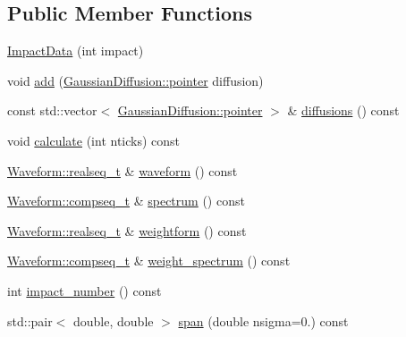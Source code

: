 \subsection*{Public Member Functions}
\begin{DoxyCompactItemize}
\item 
\hyperlink{class_wire_cell_1_1_gen_1_1_impact_data_a7e5a8376b65210d695b42d0cd587372f}{Impact\+Data} (int impact)
\item 
void \hyperlink{class_wire_cell_1_1_gen_1_1_impact_data_ac43cc32d2ea372cfc6807a72774493ec}{add} (\hyperlink{class_wire_cell_1_1_gen_1_1_gaussian_diffusion_ac7fce7070c18877fa61abc26ad410ce9}{Gaussian\+Diffusion\+::pointer} diffusion)
\item 
const std\+::vector$<$ \hyperlink{class_wire_cell_1_1_gen_1_1_gaussian_diffusion_ac7fce7070c18877fa61abc26ad410ce9}{Gaussian\+Diffusion\+::pointer} $>$ \& \hyperlink{class_wire_cell_1_1_gen_1_1_impact_data_a90443997dcd6a04fafe2f1c1fbd90bce}{diffusions} () const
\item 
void \hyperlink{class_wire_cell_1_1_gen_1_1_impact_data_a323019d50d44dea084f1691da674b755}{calculate} (int nticks) const
\item 
\hyperlink{namespace_wire_cell_1_1_waveform_a479175e541c8545e87cd8063b74b6956}{Waveform\+::realseq\+\_\+t} \& \hyperlink{class_wire_cell_1_1_gen_1_1_impact_data_a80d2f6a9ccdbba236c9e75360316b014}{waveform} () const
\item 
\hyperlink{namespace_wire_cell_1_1_waveform_a7e4a8d371f774438bb360e7d1dcb583a}{Waveform\+::compseq\+\_\+t} \& \hyperlink{class_wire_cell_1_1_gen_1_1_impact_data_afb1c936f26afc1f968f727b3f72af2e4}{spectrum} () const
\item 
\hyperlink{namespace_wire_cell_1_1_waveform_a479175e541c8545e87cd8063b74b6956}{Waveform\+::realseq\+\_\+t} \& \hyperlink{class_wire_cell_1_1_gen_1_1_impact_data_a8a2ccedf08eab6acee300809308ef216}{weightform} () const
\item 
\hyperlink{namespace_wire_cell_1_1_waveform_a7e4a8d371f774438bb360e7d1dcb583a}{Waveform\+::compseq\+\_\+t} \& \hyperlink{class_wire_cell_1_1_gen_1_1_impact_data_a81cef30a2ec41d8b63f07267506582d1}{weight\+\_\+spectrum} () const
\item 
int \hyperlink{class_wire_cell_1_1_gen_1_1_impact_data_a00db275ffb82f82831016b7ebaaed6e3}{impact\+\_\+number} () const
\item 
std\+::pair$<$ double, double $>$ \hyperlink{class_wire_cell_1_1_gen_1_1_impact_data_acccaa5e82f44245eaa0bfbd6f99eecce}{span} (double nsigma=0.) const
\end{DoxyCompactItemize}


